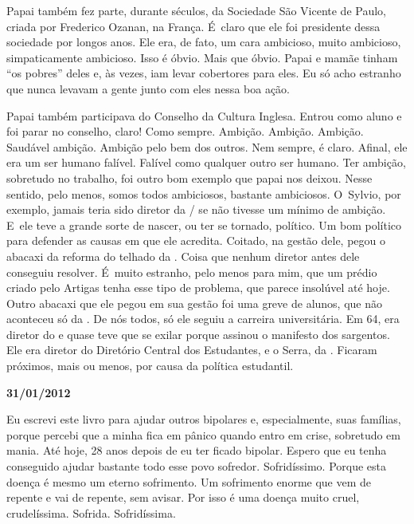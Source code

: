 Papai também fez parte, durante séculos, da Sociedade São Vicente de
Paulo, criada por Frederico Ozanan, na França. É~claro que ele foi
presidente dessa sociedade por longos anos. Ele era, de fato, um cara
ambicioso, muito ambicioso, simpaticamente ambicioso. Isso é óbvio. Mais
que óbvio. Papai e mamãe tinham ``os pobres'' deles e, às vezes, iam
levar cobertores para eles. Eu só acho estranho que nunca levavam a
gente junto com eles nessa boa ação.

Papai também participava do Conselho da Cultura Inglesa. Entrou como
aluno e foi parar no conselho, claro! Como sempre. Ambição. Ambição.
Ambição. Saudável ambição. Ambição pelo bem dos outros. Nem sempre, é
claro. Afinal, ele era um ser humano falível. Falível como qualquer
outro ser humano. Ter ambição, sobretudo no trabalho, foi outro bom
exemplo que papai nos deixou. Nesse sentido, pelo menos, somos todos
ambiciosos, bastante ambiciosos. O~Sylvio, por exemplo, jamais teria
sido diretor da / se não tivesse um mínimo de ambição. E~ele teve
a grande sorte de nascer, ou ter se tornado, político. Um bom político
para defender as causas em que ele acredita. Coitado, na gestão dele,
pegou o abacaxi da reforma do telhado da . Coisa que nenhum diretor
antes dele conseguiu resolver. É~muito estranho, pelo menos para mim,
que um prédio criado pelo Artigas tenha esse tipo de problema, que
parece insolúvel até hoje. Outro abacaxi que ele pegou em sua gestão foi
uma greve de alunos, que não aconteceu só da . De nós todos, só ele
seguiu a carreira universitária. Em 64, era diretor do  e quase teve
que se exilar porque assinou o manifesto dos sargentos. Ele era diretor
do Diretório Central dos Estudantes, e o Serra, da . Ficaram
próximos, mais ou menos, por causa da política estudantil.

\begin{center}\asterisc{}\end{center}

\begin{flushright}\textbf{31/01/2012}\end{flushright}


Eu escrevi este livro para ajudar outros bipolares e, especialmente,
suas famílias, porque percebi que a minha fica em pânico quando entro em
crise, sobretudo em mania. Até hoje, 28 anos depois de eu ter ficado
bipolar. Espero que eu tenha conseguido ajudar bastante todo esse povo
sofredor. Sofridíssimo. Porque esta doença é mesmo um eterno sofrimento.
Um sofrimento enorme que vem de repente e vai de repente, sem avisar.
Por isso é uma doença muito cruel, crudelíssima. Sofrida. Sofridíssima.

